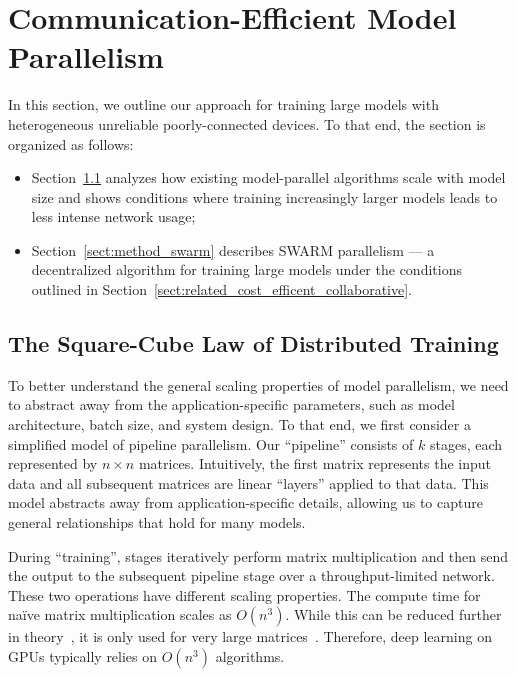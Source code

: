 \section{Communication-Efficient Model Parallelism}\label{sect:method}
\vspace{-4pt}

In this section, we outline our approach for training large models with heterogeneous unreliable poorly-connected devices.
To that end, the section is organized as follows:

\vspace{-4pt}
\begin{itemize}
    \item Section~\ref{sect:method_squarecube} analyzes how existing model-parallel algorithms scale with model size and shows conditions where training increasingly larger models leads to less intense network usage;
    \item Section~\ref{sect:method_swarm} describes SWARM parallelism --- a decentralized algorithm for training large models under the conditions outlined in Section~\ref{sect:related_cost_efficent_collaborative}.
\end{itemize}
\vspace{-12pt}

\subsection{The Square-Cube Law of Distributed Training}\label{sect:method_squarecube}

To better understand the general scaling properties of model parallelism, we need to abstract away from the application-specific parameters, such as model architecture, batch size, and system design. To that end, we first consider a simplified model of pipeline parallelism. Our ``pipeline'' consists of $k$ stages, each represented by $n{\times}n$ matrices. Intuitively, the first matrix represents the input data and all subsequent matrices are linear ``layers'' applied to that data. This model abstracts away from application-specific details, allowing us to capture general relationships that hold for many models.

During ``training'', stages iteratively perform matrix multiplication and then send the output to the subsequent pipeline stage over a throughput-limited network. These two operations have different scaling properties.
The compute time for naïve matrix multiplication scales as $O(n^3)$. While this can be reduced further in theory~\citep{coppersmith_winograd,refined_laser}, it is only used for very large matrices~\citep{practical_matmul_best,practical_matmul_earlier,strassen_reloaded}. Therefore, deep learning on GPUs typically relies on $O(n^3)$ algorithms.


